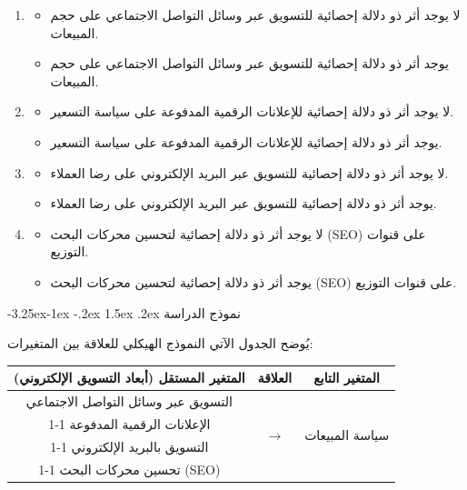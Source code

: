 \documentclass[12pt, a4paper]{report}
\makeatletter
\newcommand{\lr}[1]{\textenglish{#1}}
\renewcommand\subsection{\@startsection{subsection}{2}{\z@}%
  {-3.25ex\@plus -1ex \@minus -.2ex}%
  {1.5ex \@plus .2ex}%
  {\normalfont\large\bfseries\color{sectiongray}}}
\makeatother
\begin{document}
\begin{enumerate}[label=\arabic*.]
  \item
    \begin{itemize}
      \item[$H_{0_1}$:] لا يوجد أثر ذو دلالة إحصائية للتسويق عبر وسائل التواصل الاجتماعي على حجم المبيعات.
      \item[$H_{1_1}$:] يوجد أثر ذو دلالة إحصائية للتسويق عبر وسائل التواصل الاجتماعي على حجم المبيعات.
    \end{itemize}
  \item
    \begin{itemize}
      \item[$H_{0_2}$:] لا يوجد أثر ذو دلالة إحصائية للإعلانات الرقمية المدفوعة على سياسة التسعير.
      \item[$H_{1_2}$:] يوجد أثر ذو دلالة إحصائية للإعلانات الرقمية المدفوعة على سياسة التسعير.
    \end{itemize}
  \item
    \begin{itemize}
      \item[$H_{0_3}$:] لا يوجد أثر ذو دلالة إحصائية للتسويق عبر البريد الإلكتروني على رضا العملاء.
      \item[$H_{1_3}$:] يوجد أثر ذو دلالة إحصائية للتسويق عبر البريد الإلكتروني على رضا العملاء.
    \end{itemize}
  \item
    \begin{itemize}
      \item[$H_{0_4}$:] لا يوجد أثر ذو دلالة إحصائية لتحسين محركات البحث \lr{(SEO)} على قنوات التوزيع.
      \item[$H_{1_4}$:] يوجد أثر ذو دلالة إحصائية لتحسين محركات البحث \lr{(SEO)} على قنوات التوزيع.
    \end{itemize}
\end{enumerate}

\subsection{نموذج الدراسة}

يُوضح الجدول الآتي النموذج الهيكلي للعلاقة بين المتغيرات:

\begin{center}
\begin{tabular}{|c|c|c|}
\hline
\rowcolor{tableheader}
\textbf{المتغير المستقل (أبعاد التسويق الإلكتروني)} & \textbf{العلاقة} & \textbf{المتغير التابع} \\
\hline
التسويق عبر وسائل التواصل الاجتماعي & \multirow{4}{*}{$\longrightarrow$} & \multirow{4}{*}{سياسة المبيعات} \\
\cline{1-1}
الإعلانات الرقمية المدفوعة & & \\
\cline{1-1}
التسويق بالبريد الإلكتروني & & \\
\cline{1-1}
تحسين محركات البحث \lr{(SEO)} & & \\
\hline
\end{tabular}
\end{center}
\end{document}
